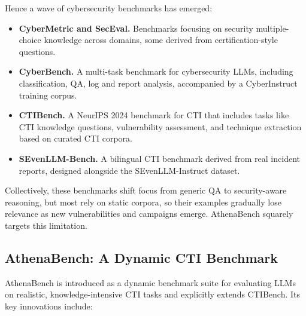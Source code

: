 \documentclass[sigconf]{acmart}
\begin{document}
Hence a wave of cybersecurity benchmarks has emerged:

\begin{itemize}
  \item \textbf{CyberMetric and SecEval.} Benchmarks focusing on security multiple-choice knowledge across domains, some derived from certification-style questions.\cite{liu2024cyberbench,hu2024seceval}
  \item \textbf{CyberBench.} A multi-task benchmark for cybersecurity LLMs, including classification, QA, log and report analysis, accompanied by a CyberInstruct training corpus.\cite{liu2024cyberbench}
  \item \textbf{CTIBench.} A NeurIPS 2024 benchmark for CTI that includes tasks like CTI knowledge questions, vulnerability assessment, and technique extraction based on curated CTI corpora.\cite{alam2024ctibench}
  \item \textbf{SEvenLLM-Bench.} A bilingual CTI benchmark derived from real incident reports, designed alongside the SEvenLLM-Instruct dataset.\cite{ji2024sevenllm}
\end{itemize}

Collectively, these benchmarks shift focus from generic QA to security-aware reasoning, but most rely on static corpora, so their examples gradually lose relevance as new vulnerabilities and campaigns emerge. AthenaBench squarely targets this limitation.

\subsection{AthenaBench: A Dynamic CTI Benchmark}

AthenaBench is introduced as a dynamic benchmark suite for evaluating LLMs on realistic, knowledge-intensive CTI tasks and explicitly extends CTIBench.\cite{alam2025athenabench,alam2024ctibench} Its key innovations include:
\end{document}
